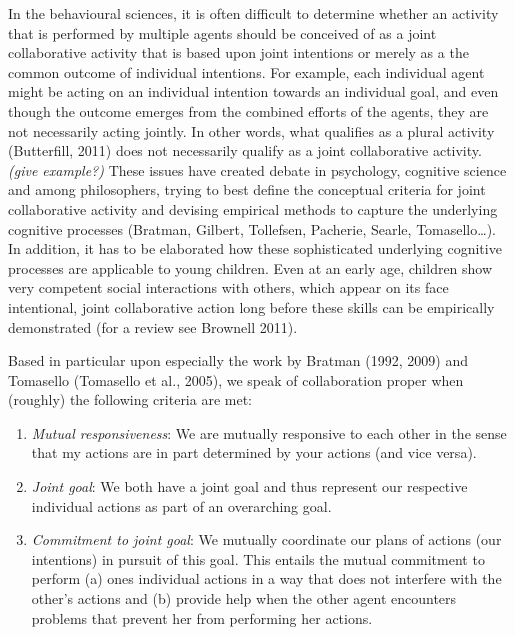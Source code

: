 \documentclass{article}
\begin{document}
In the behavioural sciences, it is often difficult to determine whether an
activity that is performed by multiple agents should be conceived of as a joint
collaborative activity that is based upon joint intentions or merely as a the
common outcome of individual intentions. For example, each individual agent
might be acting on an individual intention towards an individual goal, and even
though the outcome emerges from the combined efforts of the agents, they are
not necessarily acting jointly. In other words, what qualifies as a plural
activity (Butterfill, 2011) does not necessarily qualify as a joint
collaborative activity. \textit{(give example?)} These issues have created
debate in psychology, cognitive science and among philosophers, trying to best
define the conceptual criteria for joint collaborative activity and devising
empirical methods to capture the underlying cognitive processes (Bratman,
Gilbert, Tollefsen, Pacherie, Searle, Tomasello{\dots}). In addition, it has to
be elaborated how these sophisticated underlying cognitive processes are
applicable to young children. Even at an early age, children show very
competent social interactions with others, which appear on its face
intentional, joint collaborative action long before these skills can be
empirically demonstrated (for a review see Brownell 2011). 

Based in particular upon especially the work by Bratman (1992, 2009) and
Tomasello (Tomasello et al., 2005), we speak of collaboration proper when
(roughly) the following criteria are met:

\begin{enumerate}

\item \textit{Mutual responsiveness}: We are mutually responsive to each other
in the sense that my actions are in part determined by your actions (and vice
versa).

\item \textit{Joint goal}: We both have a joint goal and thus represent our
respective individual actions as part of an overarching goal.

\item \textit{Commitment to joint goal}: We mutually coordinate our plans of
actions (our intentions) in pursuit of this goal. This entails the mutual
commitment to perform (a) ones individual actions in a way that does not
interfere with the other's actions and (b) provide help when the other agent
encounters problems that prevent her from performing her actions.

\end{enumerate}
\end{document}
